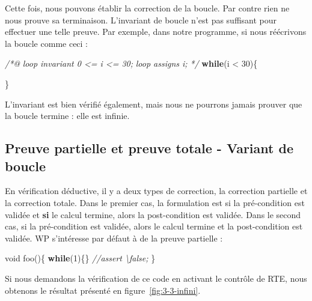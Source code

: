 \documentclass[12pt,francais,]{scrbook}
\newenvironment{Shaded}{}{}
\newcommand{\KeywordTok}[1]{\textcolor[rgb]{0.00,0.44,0.13}{\textbf{{#1}}}}
\newcommand{\DataTypeTok}[1]{\textcolor[rgb]{0.56,0.13,0.00}{{#1}}}
\newcommand{\DecValTok}[1]{\textcolor[rgb]{0.25,0.63,0.44}{{#1}}}
\newcommand{\CommentTok}[1]{\textcolor[rgb]{0.38,0.63,0.69}{\textit{{#1}}}}
\newcommand{\NormalTok}[1]{{#1}}
\begin{document}
Cette fois, nous pouvons établir la correction de la boucle. Par contre
rien ne nous prouve sa terminaison. L'invariant de boucle n'est pas
suffisant pour effectuer une telle preuve. Par exemple, dans notre
programme, si nous réécrivons la boucle comme ceci :

\begin{footnotesize}\begin{Shaded}
\begin{Highlighting}[]
\CommentTok{/*@}
\CommentTok{  loop invariant 0 <= i <= 30;}
\CommentTok{  loop assigns i;}
\CommentTok{*/}
\KeywordTok{while}\NormalTok{(i < }\DecValTok{30}\NormalTok{)\{}
   
\NormalTok{\}}
\end{Highlighting}
\end{Shaded}\end{footnotesize}

L'invariant est bien vérifié également, mais nous ne pourrons jamais
prouver que la boucle termine : elle est infinie.

\subsection{Preuve partielle et preuve totale - Variant de
boucle}\label{preuve-partielle-et-preuve-totale---variant-de-boucle}

En vérification déductive, il y a deux types de correction, la
correction partielle et la correction totale. Dans le premier cas, la
formulation est \og{}si la pré-condition est validée et \textbf{si} le
calcul termine, alors la post-condition est validée\fg{}. Dans le second
cas, \og{}si la pré-condition est validée, alors le calcul termine et la
post-condition est validée\fg{}. WP s'intéresse par défaut à de la preuve
partielle :

\begin{footnotesize}\begin{Shaded}
\begin{Highlighting}[]
\DataTypeTok{void} \NormalTok{foo()\{}
  \KeywordTok{while}\NormalTok{(}\DecValTok{1}\NormalTok{)\{\}}
  \CommentTok{//assert \textbackslash{}false;}
\NormalTok{\}}
\end{Highlighting}
\end{Shaded}\end{footnotesize}

Si nous demandons la vérification de ce code en activant le contrôle de
RTE, nous obtenons le résultat présenté en figure~\ref{fig:3-3-infini}.
\end{document}
